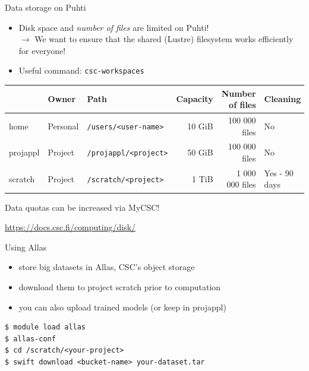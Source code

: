\documentclass[aspectratio=1610,14pt]{beamer}
\newcommand{\link}[1]{\alert{\url{#1}}}
\begin{document}
\begin{frame}{Data storage on Puhti}

  \begin{itemize}
  \item Disk space and \emph{number of files} are limited on Puhti! \\
    {\small $\rightarrow$ We want to ensure that the shared (Lustre) filesystem works
    efficiently for everyone!}
  \item Useful command: {\tt csc-workspaces}
  \end{itemize}

  \vfill

  {\footnotesize
    \begin{tabular}{lllrrl}
             & Owner    & Path                      & Capacity & Number of files & Cleaning \\
    \hline
    home     & Personal & {\tt /users/<user-name>}  & 10 GiB   & 100 000 files   & No \\
    projappl & Project  & {\tt /projappl/<project>} & 50 GiB   & 100 000 files   & No \\
    scratch  & Project  & {\tt /scratch/<project>}  & 1 TiB    & 1 000 000 files & Yes - 90 days \\
    \end{tabular}
  }
  \vfill
  {\small
    Data quotas can be increased via MyCSC!

    \link{https://docs.csc.fi/computing/disk/}}
\end{frame}

\begin{frame}[fragile]{Using Allas}
  \begin{itemize}
  \item store big datasets in Allas, CSC's object storage
  \item download them to project scratch prior to computation
  \item you can also upload trained models (or keep in projappl)
  \end{itemize}

  \vfill
  
\begin{verbatim}
$ module load allas
$ allas-conf
$ cd /scratch/<your-project>
$ swift download <bucket-name> your-dataset.tar  
\end{verbatim}
\end{frame}
\end{document}
